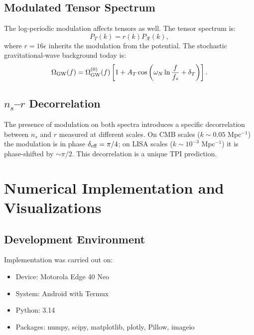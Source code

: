 \documentclass[11pt,a4paper]{article}
\theoremstyle{definition}
\begin{document}
\subsection{Modulated Tensor Spectrum}

The log-periodic modulation affects tensors as well. The tensor spectrum is:
\begin{equation}
P_T(k) = r(k) P_{\mathcal{R}}(k),
\end{equation}
where $r = 16\epsilon$ inherits the modulation from the potential. The stochastic gravitational-wave background today is:
\begin{equation}
\Omega_{\rm GW}(f) = \Omega_{\rm GW}^{(0)}(f) \left[ 1 + A_T \cos\left( \omega_N \ln\frac{f}{f_*} + \delta_T \right) \right].
\end{equation}

\subsection{$n_s$--$r$ Decorrelation}

The presence of modulation on both spectra introduces a specific decorrelation between $n_s$ and $r$ measured at different scales. On CMB scales ($k \sim 0.05$ Mpc$^{-1}$) the modulation is in phase $\delta_{\rm eff} = \pi/4$; on LISA scales ($k \sim 10^{-3}$ Mpc$^{-1}$) it is phase-shifted by $\sim \pi/2$. This decorrelation is a unique TPI prediction.

\section{Numerical Implementation and Visualizations}\label{sec:implementation}

\subsection{Development Environment}

Implementation was carried out on:
\begin{itemize}
    \item Device: Motorola Edge 40 Neo
    \item System: Android with Termux
    \item Python: 3.14
    \item Packages: numpy, scipy, matplotlib, plotly, Pillow, imageio
\end{itemize}
\end{document}
